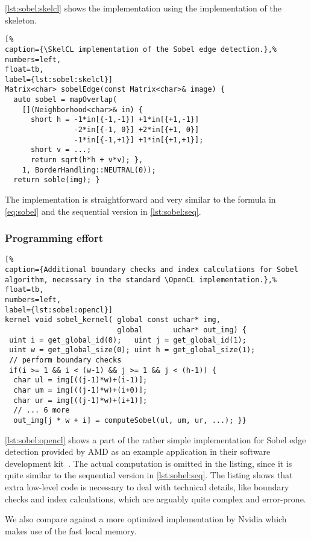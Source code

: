 \autoref{lst:sobel:skelcl} shows the \SkelCL implementation using the  implementation of the \stencil skeleton.
%
\begin{lstlisting}[%
caption={\SkelCL implementation of the Sobel edge detection.},%
numbers=left,
float=tb,
label={lst:sobel:skelcl}]
Matrix<char> sobelEdge(const Matrix<char>& image) {
  auto sobel = mapOverlap(
    [](Neighborhood<char>& in) {
      short h = -1*in[{-1,-1}] +1*in[{+1,-1}]
                -2*in[{-1, 0}] +2*in[{+1, 0}]
                -1*in[{-1,+1}] +1*in[{+1,+1}];
      short v = ...;
      return sqrt(h*h + v*v); },
    1, BorderHandling::NEUTRAL(0));
  return soble(img); }
\end{lstlisting}
%
The implementation is straightforward and very similar to the formula in \autoref{eq:sobel} and the sequential version in \autoref{lst:sobel:seq}.

\subsubsection*{Programming effort}

\begin{lstlisting}[%
caption={Additional boundary checks and index calculations for Sobel algorithm, necessary in the standard \OpenCL implementation.},%
float=tb,
numbers=left,
label={lst:sobel:opencl}]
kernel void sobel_kernel( global const uchar* img,
                          global       uchar* out_img) {
 uint i = get_global_id(0);   uint j = get_global_id(1);
 uint w = get_global_size(0); uint h = get_global_size(1);
 // perform boundary checks
 if(i >= 1 && i < (w-1) && j >= 1 && j < (h-1)) {
  char ul = img[((j-1)*w)+(i-1)];
  char um = img[((j-1)*w)+(i+0)];
  char ur = img[((j-1)*w)+(i+1)];
  // ... 6 more
  out_img[j * w + i] = computeSobel(ul, um, ur, ...); }}
\end{lstlisting}

\autoref{lst:sobel:opencl} shows a part of the rather simple \OpenCL implementation for Sobel edge detection provided by AMD as an example application in their software development kit~\cite{AMDSDK}.
The actual computation is omitted in the listing, since it is quite similar to the sequential version in \autoref{lst:sobel:seq}.
The listing shows that extra low-level code is necessary to deal with technical details, like boundary checks and index calculations, which are arguably quite complex and error-prone.

We also compare against a more optimized \OpenCL implementation by Nvidia which makes use of the fast local \GPU memory.

